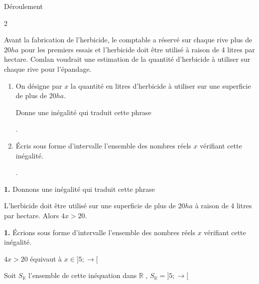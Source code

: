 \newpage
\begin{center}
	Déroulement
\end{center}  \begin{multicols*}{2}
  	
  	Avant la fabrication de l'herbicide, le comptable a réservé sur chaque rive plus de $20 ha$ pour les premiers essais et l'herbicide doit être utilisé à raison de 4 litres par hectare. Comlan voudrait une estimation de la quantité d'herbicide à utiliser sur chaque rive pour l'épandage.
  	
  	\begin{enumerate}
  		\item On désigne par $x$ la quantité en litres d'herbicide à utiliser sur une superficie de plus de $20 ha$.
  		
  		Donne une inégalité qui traduit cette phrase  
  		
  		.
  		
  		\item Écris sous forme d'intervalle l'ensemble des nombres réels $x$ vérifiant cette inégalité.
  		
  		.
  	\end{enumerate}
  	\dure
  	\resul
  	\textbf{1.} Donnons une inégalité qui traduit cette phrase
  	
  	L'herbicide doit être utilisé sur une superficie de plus de $20 ha$ à raison de 4 litres par hectare. Alors $4x>20$.
  	
  	\textbf{1.} Écrions sous forme d'intervalle l'ensemble des nombres réels $x$ vérifiant cette inégalité.
  	
  	$4x>20$ équivaut à $x\in ]5;\rightarrow[$ 
  	
  	Soit $S_{\mathbb{R}}$ l'ensemble de cette inéquation dans $\mathbb{R}$ , $S_{\mathbb{R}}=]5;\rightarrow[$
  	

\end{multicols*}
